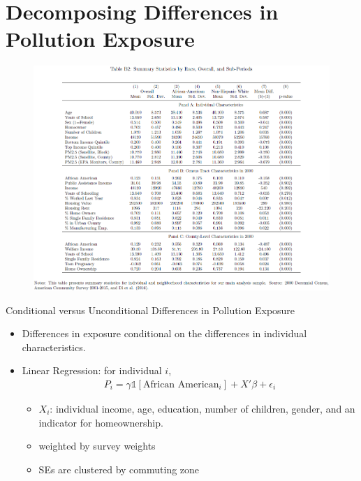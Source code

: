 \documentclass[dvipdfmx,12pt]{beamer}
\begin{document}
\section{Decomposing Differences in Pollution Exposure}
\frame{\sectionpage}
\begin{frame}{}
  \begin{figure}
    \centering
    \includegraphics[scale = .4]{TB2.png}
  \end{figure}
\end{frame}

\begin{frame}{Conditional versus Unconditional Differences in Pollution Exposure}
  \begin{itemize}
    \item Differences in exposure conditional on the differences in individual characteristics.
    \item Linear Regression: for individual $i$,
    \begin{align*}
      P_i = \gamma \mathbb{1}[\text{African American}_i] + X' \beta + \epsilon_i
    \end{align*}
    \begin{itemize}
      \item $X_i$: individual income, age, education, number of children, gender, and an indicator for homeownership.
      \item weighted by survey weights
      \item SEs are clustered by commuting zone
    \end{itemize}
  \end{itemize}
\end{frame}
\end{document}
